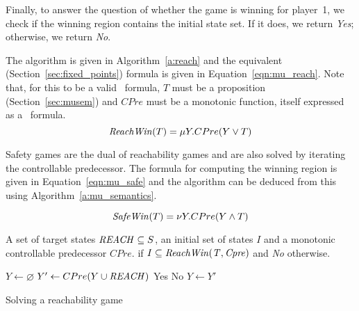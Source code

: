 Finally, to answer the question of whether the game is winning for player~1, we check if the winning region contains the initial state set. If it does, we return \emph{Yes}; otherwise, we return \emph{No}.

The algorithm is given in Algorithm~\ref{a:reach} and the equivalent \mucalc (Section~\ref{sec:fixed_points}) formula is given in Equation~\ref{eqn:mu_reach}. Note that, for this to be a valid \mucalc\ formula, $T$ must be a proposition (Section~\ref{sec:musem}) and $CPre$ must be a monotonic function, itself expressed as a \mucalc\ formula.
\begin{equation}
    \mathit{ReachWin}(T) = \mu Y. CPre(Y \vee T)
\label{eqn:mu_reach}
\end{equation}

Safety games are the dual of reachability games and are also solved by iterating the controllable predecessor. The \mucalc formula for computing the winning region is given in Equation~\ref{eqn:mu_safe} and the algorithm can be deduced from this using Algorithm~\ref{a:mu_semantics}.

\begin{equation}
\mathit{SafeWin}(T) = \nu Y. CPre(Y \wedge T)
\label{eqn:mu_safe}
\end{equation}

\begin{algorithm}[t]
\begin{algorithmic}

\Require A set of target states $\mathit{REACH} \subseteq S$, an initial set of states $I$ and a monotonic controllable predecessor $CPre$.
 if $I \subseteq \mathit{ReachWin(T, Cpre)}$ and {\it No} otherwise.

    \State $Y \gets \varnothing$
    \Loop
        \State $Y' \gets CPre(Y \cup \mathit{REACH})$
                \State\Return Yes
            \Else
                \State\Return No
            \EndIf
        \EndIf
        \State $Y \gets Y'$
    \EndLoop
\EndFunction

\end{algorithmic}
\caption{Solving a reachability game}
\label{a:reach}
\end{algorithm}

\subsection{\buchi}

